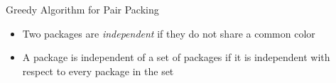 \begin{frame}{Greedy Algorithm for Pair Packing}
\begin{itemize}


\item
Two packages are \emph{independent} if they do not share a common color

\pause\item
A package is independent of a set of packages if it is independent with respect to every
package in the set  



\end{itemize}
\end{frame}